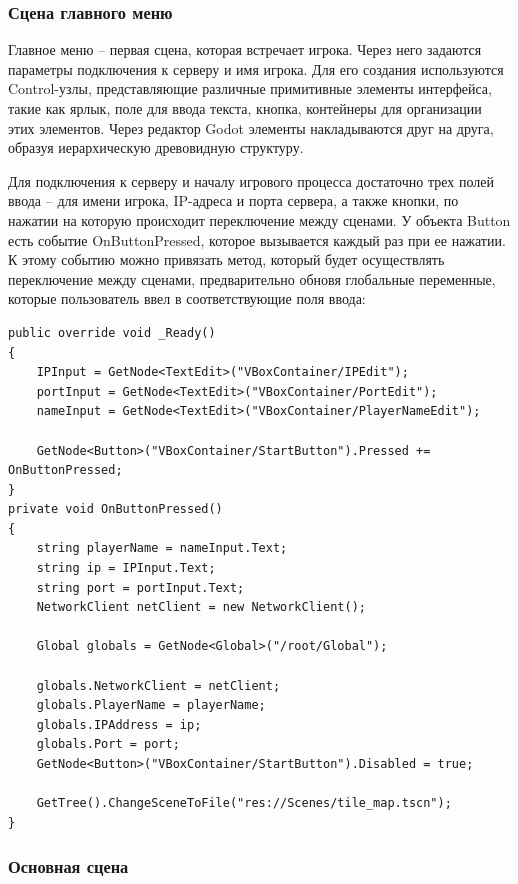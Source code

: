        \subsubsection{Сцена главного меню}

        Главное меню -- первая сцена, которая встречает игрока. Через него задаются параметры подключения к серверу и имя игрока. Для его создания используются Control-узлы, представляющие
        различные примитивные элементы интерфейса, такие как ярлык, поле для ввода текста, кнопка, контейнеры для организации этих элементов. Через редактор Godot элементы накладываются друг на
        друга, образуя иерархическую древовидную структуру.

        Для подключения к серверу и началу игрового процесса достаточно трех полей ввода -- для имени игрока, IP-адреса и порта сервера, а также кнопки, по нажатии на которую происходит
        переключение между сценами. У объекта Button есть событие OnButtonPressed, которое вызывается каждый раз при ее нажатии. К этому событию можно привязать метод, который будет
        осуществлять переключение между сценами, предварительно обновя глобальные переменные, которые пользователь ввел в соответствующие поля ввода:

        \begin{lstlisting}[caption=Реализация логики главного меню]
public override void _Ready()
{
    IPInput = GetNode<TextEdit>("VBoxContainer/IPEdit");
    portInput = GetNode<TextEdit>("VBoxContainer/PortEdit");
    nameInput = GetNode<TextEdit>("VBoxContainer/PlayerNameEdit");

    GetNode<Button>("VBoxContainer/StartButton").Pressed += OnButtonPressed;
}
private void OnButtonPressed()
{
    string playerName = nameInput.Text;
    string ip = IPInput.Text;
    string port = portInput.Text;
    NetworkClient netClient = new NetworkClient();

    Global globals = GetNode<Global>("/root/Global");

    globals.NetworkClient = netClient;
    globals.PlayerName = playerName;
    globals.IPAddress = ip;
    globals.Port = port;
    GetNode<Button>("VBoxContainer/StartButton").Disabled = true;

    GetTree().ChangeSceneToFile("res://Scenes/tile_map.tscn");
}
        \end{lstlisting}

        \subsubsection{Основная сцена}


